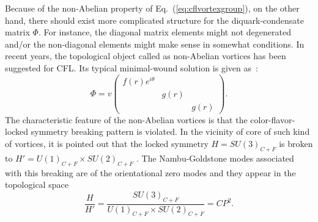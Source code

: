 \documentclass[12pt]{article}
\begin{document}
Because of the non-Abelian property of Eq.~(\ref{eq:cflvortexgroup}), on the other hand, 
there should exist more complicated structure for the diquark-condensate matrix $\Phi$. For instance, the
diagonal matrix elements might not degenerated and/or the non-diagonal elements might make sense in somewhat conditions.
In recent years, the topological object called as non-Abelian vortices has been suggested for
CFL.
Its typical minimal-wound solution is given
as~\cite{balachandran2006semisuperfluid,nakano2008non,eto2009color}:
\begin{equation}
  \label{eq:nvortex}
  \Phi = v\begin{pmatrix}
   f(r)e^{i\theta} & & \\ & g(r) & \\ & & g(r)
  \end{pmatrix}.
\end{equation}
The characteristic feature of the non-Abelian vortices
is that the color-flavor-locked symmetry breaking pattern is violated. In the vicinity of core of such kind of vortices, it is pointed out that the locked symmetry $H={SU(3)_{C+F}}$ is broken to
$H' =U(1)_{C+F} \times SU(2)_{C+F}$ \cite{nakano2008non,vinci2012spontaneous}.
The Nambu-Goldstone modes associated with this breaking are of the orientational zero modes and they appear in the
topological space
\begin{equation}
  \label{eq:cp2}
 \frac{H}{H'} = \frac{SU(3)_{C+F}}{U(1)_{C+F} \times SU(2)_{C+F}} = CP^2.
\end{equation}
\end{document}
